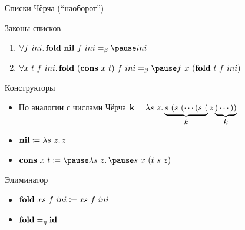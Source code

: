     \begin{frame}[fragile]{Списки Чёрча (``наоборот'')}
        \begin{block}{Законы списков}
            \begin{enumerate}
                \item \pause $\forall f~ini\ldotp \term{fold} \ap \term{nil} \ap f \ap ini \eqbeta \pause ini$
                \item \pause $\forall x~t~f~ini\ldotp \term{fold} \ap (\term{cons} \ap x \ap t) \ap f \ap ini \eqbeta \pause f \ap x \ap (\term{fold} \ap t \ap f \ap ini)$
            \end{enumerate}
        \end{block}
        \pause
        \begin{block}{Конструкторы}
            \begin{itemize}
                \item По аналогии с числами Чёрча $\mathbf{k} = \lambda s~z\ldotp \underbrace{s~(s~(\cdots (s~(}_{\textstyle k} z\underbrace{)\cdots ))}_{\textstyle k}$
                \item $\mathbf{nil} \coloneqq \lambda s~z \ldotp z$
                \item $\term{cons} \ap x \ap t \termdef \pause \lambda s~z\ldotp \pause s~x~(t~s~z)$
            \end{itemize}
        \end{block}
        \pause
        \begin{block}{Элиминатор}
            \begin{itemize}
                \item $\mathbf{fold} ~ xs ~ f ~ ini \coloneqq xs ~ f ~ ini$
                \item $\mathbf{fold} =_\eta \mathbf{id}$
            \end{itemize}
        \end{block}
    \end{frame}


